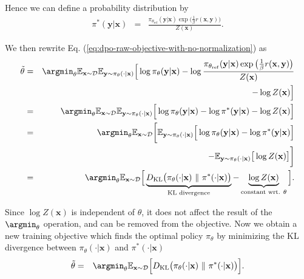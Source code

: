 Hence we can define a probability distribution by
\begin{eqnarray}
\pi^*(\mathbf{y}|\mathbf{x}) & = & \frac{\pi_{\theta_{\mathrm{ref}}}(\mathbf{y}|\mathbf{x}) \exp \big(\frac{1}{\beta} r(\mathbf{x},\mathbf{y}) \big)}{Z(\mathbf{x})}.
\end{eqnarray}

We then rewrite Eq. (\ref{eq:dpo-raw-objective-with-no-normalization}) as
\begin{eqnarray}
\tilde{\theta} & = & \argmin_{\theta} \mathbb{E}_{\mathbf{x} \sim \mathcal{D}} \mathbb{E}_{\mathbf{y} \sim \pi_{\theta}(\cdot|\mathbf{x})} \Big[ \log \pi_{\theta}(\mathbf{y}|\mathbf{x}) - \log \frac{\pi_{\theta_{\mathrm{ref}}}(\mathbf{y}|\mathbf{x}) \exp \big(\frac{1}{\beta} r(\mathbf{x},\mathbf{y}) \big)}{Z(\mathbf{x})} \nonumber \\
& & \hspace{10.5em} - \log Z(\mathbf{x}) \Big] \nonumber \\
& = & \argmin_{\theta} \mathbb{E}_{\mathbf{x} \sim \mathcal{D}} \mathbb{E}_{\mathbf{y} \sim \pi_{\theta}(\cdot|\mathbf{x})} \Big[ \log \pi_{\theta}(\mathbf{y}|\mathbf{x}) - \log \pi^{*}(\mathbf{y}|\mathbf{x}) - \log Z(\mathbf{x}) \Big] \nonumber \\
& = & \argmin_{\theta} \mathbb{E}_{\mathbf{x} \sim \mathcal{D}} \bigg[ \mathbb{E}_{\mathbf{y} \sim \pi_{\theta}(\cdot|\mathbf{x})} \Big[ \log \pi_{\theta}(\mathbf{y}|\mathbf{x}) - \log \pi^{*}(\mathbf{y}|\mathbf{x}) \Big] \nonumber \\
&  & \hspace{6.5em} - \mathbb{E}_{\mathbf{y} \sim \pi_{\theta}(\cdot|\mathbf{x})} \big[ \log Z(\mathbf{x}) \big] \bigg] \nonumber \\
& = & \argmin_{\theta} \mathbb{E}_{\mathbf{x} \sim \mathcal{D}} \Big[ \underbrace{D_{\mathrm{KL}} \big(\pi_{\theta}(\cdot|\mathbf{x})\ \|\ \pi^{*}(\cdot|\mathbf{x}) \big)}_{\text{KL divergence}} - \underbrace{\log Z(\mathbf{x})}_{\text{constant wrt. $\theta$}} \Big].
\end{eqnarray}

Since $\log Z(\mathbf{x})$ is independent of $\theta$, it does not affect the result of the $\argmin_{\theta}$ operation, and can be removed from the objective. Now we obtain a new training objective which finds the optimal policy $\pi_{\theta}$ by minimizing the KL divergence between $\pi_{\theta}(\cdot|\mathbf{x})$ and $\pi^{*}(\cdot|\mathbf{x})$
\begin{eqnarray}
\tilde{\theta} & = & \argmin_{\theta} \mathbb{E}_{\mathbf{x} \sim \mathcal{D}} \Big[ D_{\mathrm{KL}} \big(\pi_{\theta}(\cdot|\mathbf{x})\ \|\ \pi^{*}(\cdot|\mathbf{x}) \big) \Big].
\end{eqnarray}

